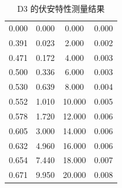 \documentclass[a4paper,utf8]{article}
\begin{document}
\begin{table}[!ht]
{\begin{tabular}{*{4}{S[table-format=2.3]}}
            0.000 & 0.000 & 0.000 & 0.000 \\
            0.391 & 0.023 & 2.000 & 0.002 \\
            0.471 & 0.172 & 4.000 & 0.003 \\
            0.500 & 0.336 & 6.000 & 0.003 \\
            0.530 & 0.639 & 8.000 & 0.004 \\
            0.552 & 1.010 & 10.000 & 0.005 \\
            0.578 & 1.720 & 12.000 & 0.006 \\
            0.605 & 3.000 & 14.000 & 0.006 \\
            0.632 & 4.960 & 16.000 & 0.006 \\
            0.654 & 7.440 & 18.000 & 0.007 \\
            0.671 & 9.950 & 20.000 & 0.008 \\ \bottomrule
        \end{tabular}}
        \caption{D3 的伏安特性测量结果}
    \end{table}
\end{document}

